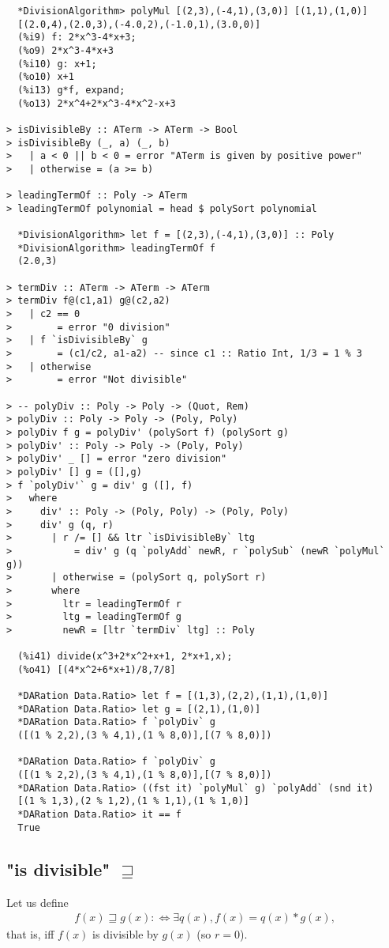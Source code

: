 \documentclass[11pt]{book}
\begin{document}
\begin{verbatim}
  *DivisionAlgorithm> polyMul [(2,3),(-4,1),(3,0)] [(1,1),(1,0)]
  [(2.0,4),(2.0,3),(-4.0,2),(-1.0,1),(3.0,0)]
  (%i9) f: 2*x^3-4*x+3;
  (%o9) 2*x^3-4*x+3
  (%i10) g: x+1;
  (%o10) x+1
  (%i13) g*f, expand;
  (%o13) 2*x^4+2*x^3-4*x^2-x+3

> isDivisibleBy :: ATerm -> ATerm -> Bool
> isDivisibleBy (_, a) (_, b) 
>   | a < 0 || b < 0 = error "ATerm is given by positive power"
>   | otherwise = (a >= b)

> leadingTermOf :: Poly -> ATerm
> leadingTermOf polynomial = head $ polySort polynomial 

  *DivisionAlgorithm> let f = [(2,3),(-4,1),(3,0)] :: Poly 
  *DivisionAlgorithm> leadingTermOf f
  (2.0,3)

> termDiv :: ATerm -> ATerm -> ATerm
> termDiv f@(c1,a1) g@(c2,a2)
>   | c2 == 0             
>        = error "0 division"
>   | f `isDivisibleBy` g 
>        = (c1/c2, a1-a2) -- since c1 :: Ratio Int, 1/3 = 1 % 3
>   | otherwise           
>        = error "Not divisible"

> -- polyDiv :: Poly -> Poly -> (Quot, Rem)
> polyDiv :: Poly -> Poly -> (Poly, Poly)
> polyDiv f g = polyDiv' (polySort f) (polySort g)
> polyDiv' :: Poly -> Poly -> (Poly, Poly)
> polyDiv' _ [] = error "zero division"
> polyDiv' [] g = ([],g)
> f `polyDiv'` g = div' g ([], f)
>   where
>     div' :: Poly -> (Poly, Poly) -> (Poly, Poly)
>     div' g (q, r)
>       | r /= [] && ltr `isDivisibleBy` ltg
>           = div' g (q `polyAdd` newR, r `polySub` (newR `polyMul` g)) 
>       | otherwise = (polySort q, polySort r)
>       where
>         ltr = leadingTermOf r
>         ltg = leadingTermOf g
>         newR = [ltr `termDiv` ltg] :: Poly

  (%i41) divide(x^3+2*x^2+x+1, 2*x+1,x);
  (%o41) [(4*x^2+6*x+1)/8,7/8]

  *DARation Data.Ratio> let f = [(1,3),(2,2),(1,1),(1,0)]
  *DARation Data.Ratio> let g = [(2,1),(1,0)]
  *DARation Data.Ratio> f `polyDiv` g
  ([(1 % 2,2),(3 % 4,1),(1 % 8,0)],[(7 % 8,0)])

  *DARation Data.Ratio> f `polyDiv` g
  ([(1 % 2,2),(3 % 4,1),(1 % 8,0)],[(7 % 8,0)])
  *DARation Data.Ratio> ((fst it) `polyMul` g) `polyAdd` (snd it)
  [(1 % 1,3),(2 % 1,2),(1 % 1,1),(1 % 1,0)]
  *DARation Data.Ratio> it == f
  True
\end{verbatim}

\subsection{"is divisible" $\sqsupseteq$}
Let us define
\begin{eqnarray}
f(x) \sqsupseteq g(x) :\Leftrightarrow \exists q(x), f(x) = q(x) * g(x),
\end{eqnarray}
that is, iff $f(x)$ is divisible by $g(x)$ (so $r=0$).
\end{document}
